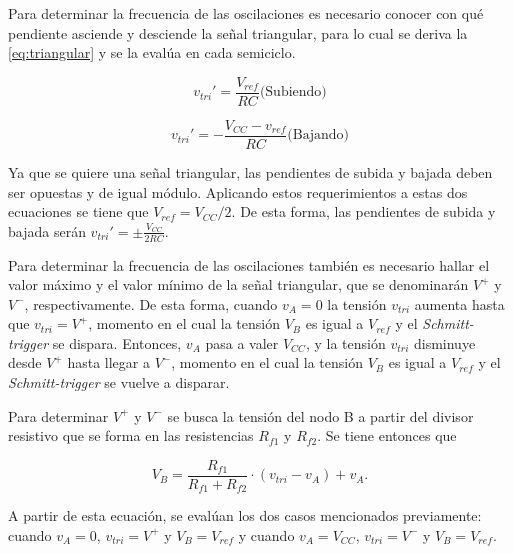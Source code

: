 Para determinar la frecuencia de las oscilaciones es necesario conocer con qué pendiente asciende y desciende la señal triangular, para lo cual se deriva la \autoref{eq:triangular} y se la evalúa en cada semiciclo.

\begin{minipage}{0.45\textwidth}
    \centering
    \begin{equation}
        v_{tri}' = \frac{V_{ref}}{RC} \text{(Subiendo)}
        \label{eq:derivada subiendo}
    \end{equation}
\end{minipage}
\hfill
\begin{minipage}{0.45\textwidth}
    \centering
    \begin{equation}
        v_{tri}' = -\frac{V_
        {CC} - v_{ref}}{RC} \text{(Bajando)}
        \label{eq:derivada bajando}
    \end{equation}
\end{minipage}

Ya que se quiere una señal triangular, las pendientes de subida y bajada deben ser opuestas y de igual módulo. Aplicando estos requerimientos a estas dos ecuaciones se tiene que $V_{ref} = V_{CC}/2$. De esta forma, las pendientes de subida y bajada serán $v_{tri}' = \pm \frac{V_
{CC}}{2RC}$. 

Para determinar la frecuencia de las oscilaciones también es necesario hallar el valor máximo y el valor mínimo de la señal triangular, que se denominarán $V^+$ y $V^-$, respectivamente. De esta forma, cuando $v_A = 0$ la tensión $v_{tri}$ aumenta hasta que $v_{tri} = V^+$, momento en el cual la tensión $V_B$ es igual a $V_{ref}$ y el \textit{Schmitt-trigger} se dispara. Entonces, $v_A$ pasa a valer $V_{CC}$, y la tensión $v_{tri}$ disminuye desde $V^+$ hasta llegar a $V^-$, momento en el cual la tensión $V_B$ es igual a $V_{ref}$ y el \textit{Schmitt-trigger} se vuelve a disparar. 

Para determinar $V^+$ y $V^-$ se busca la tensión del nodo B a partir del divisor resistivo que se forma en las resistencias $R_{f1}$ y $R_{f2}$. Se tiene entonces que

\begin{equation}
    V_B = \frac{R_{f1}}{R_{f1} + R_{f2}} \cdot (v_{tri} - v_A) + v_A.
    \label{eq:nodo B}
\end{equation}

A partir de esta ecuación, se evalúan los dos casos mencionados previamente: cuando $v_A = 0$, $v_{tri} = V^+$ y $V_B = V_{ref}$ y cuando $v_A = V_{CC}$, $v_{tri} = V^-$ y $V_B = V_{ref}$. 

